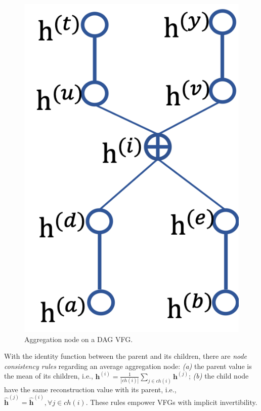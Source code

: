 \documentclass[sigconf, anonymous, review]{acmart}
\theoremstyle{plain}
\theoremstyle{definition}
\theoremstyle{remark}
\begin{document}
\begin{figure}
\begin{center}
 \includegraphics[width=1.0\linewidth]{fig/dag_aggr.png}
\end{center}
\caption{ {\small  Aggregation node on a DAG VFG.}}
\label{fig:dag_aggr}

\end{figure}
With the identity function between the  parent and its children, there are \emph{node consistency rules} regarding an average aggregation node: {\it(a)} the parent value is the mean of its children, i.e., $\mathbf{h}^{(i)} = \frac{1}{|ch(i)|} \sum_{j \in ch(i)} \mathbf{h}^{(j)}$; {\it(b)} the  child node have the same reconstruction value with its parent, i.e., $\widehat{\mathbf{h}}^{(j)} = \widehat{\mathbf{h}}^{(i)}, \forall j \in ch(i)$. These rules empower VFGs with implicit invertibility. 
\end{document}
